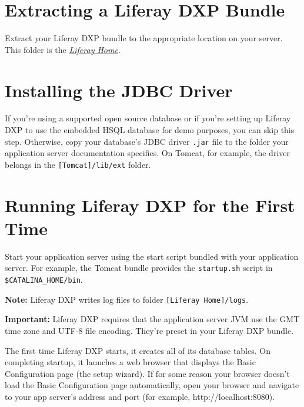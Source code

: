 \section{Extracting a Liferay DXP
Bundle}\label{extracting-a-liferay-dxp-bundle}

Extract your Liferay DXP bundle to the appropriate location on your
server. This folder is the
\href{/docs/7-2/deploy/-/knowledge_base/d/liferay-home}{\emph{Liferay
Home}}.

\section{Installing the JDBC Driver}\label{installing-the-jdbc-driver}

If you're using a supported open source database or if you're setting up
Liferay DXP to use the embedded HSQL database for demo purposes, you can
skip this step. Otherwise, copy your database's JDBC driver
\texttt{.jar} file to the folder your application server documentation
specifies. On Tomcat, for example, the driver belongs in the
\texttt{{[}Tomcat{]}/lib/ext} folder.

\section{Running Liferay DXP for the First
Time}\label{running-liferay-dxp-for-the-first-time}

Start your application server using the start script bundled with your
application server. For example, the Tomcat bundle provides the
\texttt{startup.sh} script in \texttt{\$CATALINA\_HOME/bin}.

\noindent\hrulefill

\textbf{Note:} Liferay DXP writes log files to folder
\texttt{{[}Liferay\ Home{]}/logs}.

\noindent\hrulefill

\noindent\hrulefill

\textbf{Important:} Liferay DXP requires that the application server JVM
use the GMT time zone and UTF-8 file encoding. They're preset in your
Liferay DXP bundle.

\noindent\hrulefill

The first time Liferay DXP starts, it creates all of its database
tables. On completing startup, it launches a web browser that displays
the Basic Configuration page (the setup wizard). If for some reason your
browser doesn't load the Basic Configuration page automatically, open
your browser and navigate to your app server's address and port (for
example, http://localhost:8080).

